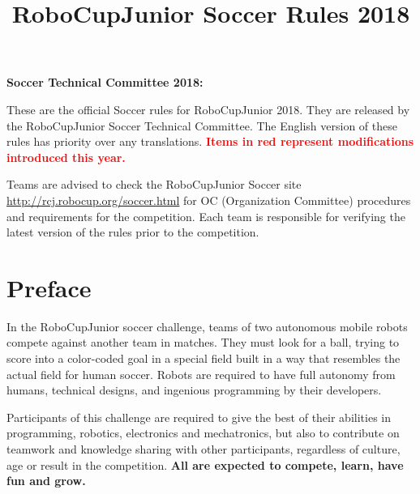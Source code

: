 \documentclass{article}
\title{\vspace{-5ex}RoboCupJunior Soccer Rules 2018\vspace{-5ex}}
\date{\vspace{-2ex}}
\begin{document}
\maketitle
\thispagestyle{firststyle}

\textbf{Soccer Technical Committee 2018:}


These are the official Soccer rules for RoboCupJunior 2018. They are released
by the RoboCupJunior Soccer Technical Committee. The English version of these
rules has priority over any translations. \textcolor{red}{\textbf{Items in red represent modifications introduced this year.}}

Teams are advised to check the RoboCupJunior Soccer site \href{http://rcj.robocup.org/soccer.html}{http://rcj.robocup.org/soccer.html} for OC (Organization Committee) procedures and requirements for the competition. Each team is responsible for verifying the latest version of the rules prior to the competition.

\section*{Preface}

In the RoboCupJunior soccer challenge, teams of two autonomous mobile robots compete against another team in matches. They must look for a ball, trying to score into a color-coded goal in a special field built in a way that resembles the actual field for human soccer. Robots are required to have full autonomy from humans, technical designs, and ingenious programming by their developers.

Participants of this challenge are required to give the best of their abilities in programming, robotics, electronics and mechatronics, but also to contribute on teamwork and knowledge sharing with other participants, regardless of culture, age or result in the competition. \textbf{All are expected to compete, learn, have fun and grow.}
\end{document}
